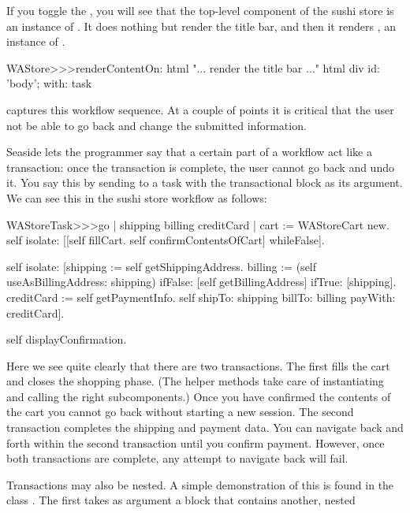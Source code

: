 \documentclass[a4paper,10pt,twoside]{book}
\begin{document}
If you toggle the , you will see that the top-level component of the sushi store is an instance of .
It does nothing but render the title bar, and then it renders , an instance of .

\begin{code}{}
WAStore>>>renderContentOn: html
	"... render the title bar ..."
	html div id: 'body'; with: task
\end{code}

 captures this workflow sequence. At a couple of points it is critical that the user not be able to go back and change the submitted information.


Seaside lets the programmer say that a certain part of a workflow act like a transaction: once the transaction is complete, the user cannot go back and undo it.
You say this by sending  to a task with the transactional block as its argument.
We can see this in the sushi store workflow as follows:

\begin{code}{}
WAStoreTask>>>go
	| shipping billing creditCard |
	cart := WAStoreCart new.
	self isolate:
		[[self fillCart.
		self confirmContentsOfCart]
			whileFalse].

	self isolate:
		[shipping := self getShippingAddress.
		billing := (self useAsBillingAddress: shipping)
					ifFalse: [self getBillingAddress]
					ifTrue: [shipping].
		creditCard := self getPaymentInfo.
		self shipTo: shipping billTo: billing payWith: creditCard].

	self displayConfirmation.
\end{code}

Here we see quite clearly that there are two transactions.
The first fills the cart and closes the shopping phase.
(The helper methods  \etc take care of instantiating and calling the right subcomponents.)
Once you have confirmed the contents of the cart you cannot go back without starting a new session.
The second transaction completes the shipping and payment data.
You can navigate back and forth within the second transaction until you confirm payment.
However, once both transactions are complete, any attempt to navigate back will fail.

Transactions may also be nested.
A simple demonstration of this is found in the class .
The first  takes as argument a block that contains another, nested 
\end{document}
